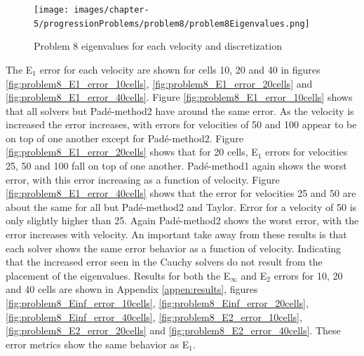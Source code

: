 \clearpage

\begin{figure}[p]
    \centering
    \texttt{[image: images/chapter-5/progressionProblems/problem8/problem8Eigenvalues.png]}
    \caption{Problem 8 eigenvalues for each velocity and discretization}
    \label{fig:problem8_eigenvalues}
\end{figure}

\clearpage

The E${}_{1}$ error for each velocity are shown for cells 10, 20 and 40 in figures \ref{fig:problem8_E1_error_10cells}, \ref{fig:problem8_E1_error_20cells} and \ref{fig:problem8_E1_error_40cells}. Figure \ref{fig:problem8_E1_error_10cells} shows that all solvers but Pad\'e-method2 have around the same error. As the velocity is increased the error increases, with errors for velocities of 50 and 100 appear to be on top of one another except for Pad\'e-method2. Figure \ref{fig:problem8_E1_error_20cells} shows that for 20 cells, E${}_{1}$ errors for velocities 25, 50 and 100 fall on top of one another. Pad\'e-method1 again shows the worst error, with this error increasing as a function of velocity. Figure \ref{fig:problem8_E1_error_40cells} shows that the error for velocities 25 and 50 are about the same for all but Pad\'e-method2 and Taylor. Error for a velocity of 50 is only slightly higher than 25. Again Pad\'e-method2 shows the worst error, with the error increases with velocity. An important take away from these results is that each solver shows the same error behavior as a function of velocity. Indicating that the increased error seen in the Cauchy solvers do not result from the placement of the eigenvalues. Results for both the E${}_{\infty}$ and E${}_{2}$ errors for 10, 20 and 40 cells are shown in Appendix \ref{appen:results}, figures \ref{fig:problem8_Einf_error_10cells}, \ref{fig:problem8_Einf_error_20cells}, \ref{fig:problem8_Einf_error_40cells}, \ref{fig:problem8_E2_error_10cells}, \ref{fig:problem8_E2_error_20cells} and \ref{fig:problem8_E2_error_40cells}. These error metrics show the same behavior as E${}_{1}$. 

